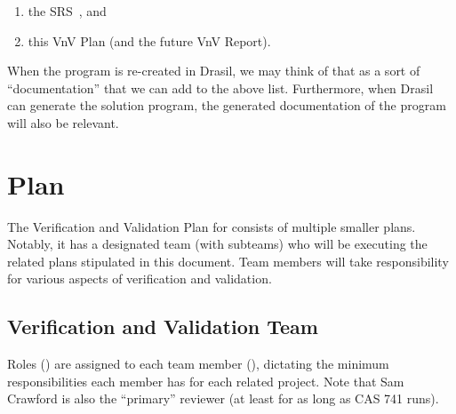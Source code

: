 \documentclass[12pt, titlepage]{article}
\begin{document}
\begin{enumerate}

    \item the SRS~\cite{BalaciBeamBendingSRS2023}, and

    \item this VnV Plan (and the future VnV Report).

\end{enumerate}

\noindent{}When the \progname{} program is re-created in Drasil, we may think of
that as a sort of ``documentation'' that we can add to the above list.
Furthermore, when Drasil can generate the solution program, the generated
documentation of the program will also be relevant.

\newpage{}

\section{Plan}

The Verification and Validation Plan for \progname{} consists of multiple
smaller plans. Notably, it has a designated team (with subteams) who will be
executing the related plans stipulated in this document. Team members will take
responsibility for various aspects of verification and validation.

\subsection{Verification and Validation Team}

Roles () are assigned to each team member
(), dictating the minimum responsibilities each member
has for each related project. Note that Sam Crawford is also the ``primary''
reviewer (at least for as long as CAS 741 runs).
\end{document}
